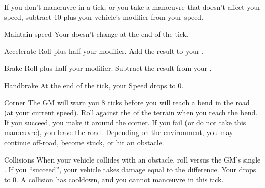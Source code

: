 
If you don't man\oe{}uvre in a tick, or you take a man\oe{}uvre that doesn't affect your speed, subtract 10 plus your vehicle's  modifier from your speed.

\begin{describe}{Maintain speed}
  Your  doesn't change at the end of the tick.
\end{describe}

\begin{describe}{Accelerate}
  Roll  plus half your  modifier. Add the result to your .
\end{describe}

\begin{describe}{Brake}
  Roll  plus half your  modifier. Subtract the result from your .
\end{describe}

\begin{describe}{Handbrake}
  At the end of the tick, your Speed drops to 0.
\end{describe}

\begin{describe}{Corner}
  The GM will warn you 8 ticks before you will reach a bend in the road (at your current speed). Roll  against the  of the terrain when you reach the bend. If you succeed, you make it around the corner. If you fail (or do not take this man\oe{}uvre), you leave the road. Depending on the environment, you may continue off-road, become stuck, or hit an obstacle.
\end{describe}

\begin{abstractsection}{Collisions}
  When your vehicle collides with an obstacle, roll  versus the GM's single . If you ``succeed'', your vehicle takes damage equal to the difference. Your  drops to 0. A collision has  cooldown, and you cannot man\oe{}uvre in this tick. 
\end{abstractsection}
